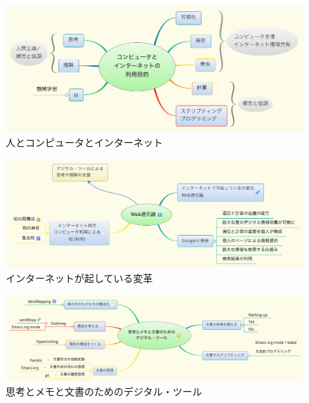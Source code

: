 \documentclass[dvipdfmx,11pat]{jarticle}
\begin{document}
\begin{figure}[htbp]
\centering
\includegraphics[width=18cm]{./map-images/03-how_to_use_computer_and_internet.png}
\caption{人とコンピュータとインターネット}
\end{figure}


\vspace{3cm}

\begin{figure}[htbp]
\centering
\includegraphics[width=18cm]{./map-images/04-Web_revolution.png}
\caption{インターネットが起している変革}
\end{figure}


\begin{figure}[htbp]
\centering
\includegraphics[width=18cm]{./map-images/05-digital_tools_for_thinking.png}
\caption{思考とメモと文書のためのデジタル・ツール}
\end{figure}
\end{document}
